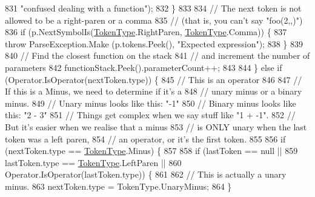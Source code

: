\begin{DoxyCode}
831                                 \textcolor{stringliteral}{"confused dealing with a function"});
832                         \}
833 
834                         \textcolor{comment}{// The next token is not allowed to be a right-paren or a comma}
835                         \textcolor{comment}{// (that is, you can't say "foo(2,,)")}
836                         \textcolor{keywordflow}{if} (p.NextSymbolIs(\hyperlink{a00026_a301aa7c866593a5b625a8fc158bbeace}{TokenType}.RightParen, 
      \hyperlink{a00026_a301aa7c866593a5b625a8fc158bbeace}{TokenType}.Comma)) \{
837                             \textcolor{keywordflow}{throw} ParseException.Make (p.tokens.Peek(), \textcolor{stringliteral}{"Expected expression"});
838                         \}
839 
840                         \textcolor{comment}{// Find the closest function on the stack}
841                         \textcolor{comment}{// and increment the number of parameters}
842                         functionStack.Peek().parameterCount++;
843 
844                     \} \textcolor{keywordflow}{else} \textcolor{keywordflow}{if} (Operator.IsOperator(nextToken.type)) \{
845                         \textcolor{comment}{// This is an operator}
846 
847                         \textcolor{comment}{// If this is a Minus, we need to determine if it's a }
848                         \textcolor{comment}{// unary minus or a binary minus.}
849                         \textcolor{comment}{// Unary minus looks like this: "-1"}
850                         \textcolor{comment}{// Binary minus looks like this: "2 - 3"}
851                         \textcolor{comment}{// Things get complex when we say stuff like "1 + -1".}
852                         \textcolor{comment}{// But it's easier when we realise that a minus}
853                         \textcolor{comment}{// is ONLY unary when the last token was a left paren,}
854                         \textcolor{comment}{// an operator, or it's the first token.}
855 
856                         \textcolor{keywordflow}{if} (nextToken.type == \hyperlink{a00026_a301aa7c866593a5b625a8fc158bbeace}{TokenType}.Minus) \{
857 
858                             \textcolor{keywordflow}{if} (lastToken == null || 
859                                 lastToken.type == \hyperlink{a00026_a301aa7c866593a5b625a8fc158bbeace}{TokenType}.LeftParen ||
860                                 Operator.IsOperator(lastToken.type)) \{
861 
862                                 \textcolor{comment}{// This is actually a unary minus.}
863                                 nextToken.type = TokenType.UnaryMinus;
864                             \}

\end{DoxyCode}
